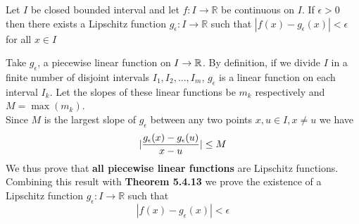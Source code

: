 \documentclass[boxes, qed]{homework}
\DeclarePairedDelimiter\abs{\lvert}{\rvert}%
\begin{document}
\begin{problem}Let $I$ be closed bounded interval and let $f: I \to \mathbb{R}$ be continuous on $I$.
  If $\epsilon > 0$ then there exists a Lipschitz function $g_{\epsilon}: I\to \mathbb{R}$ 
  such that $|f(x) - g_{\epsilon}(x)| < \epsilon$ for all $x\in I$
\end{problem}
\begin{solution}
  Take $g_{\epsilon}$, a piecewise linear function on $I\to \Bbb R$. By definition,
  if we divide $I$ in a finite number of disjoint intervals $I_1,I_2,\dots,I_m$,
  $g_{\epsilon}$ is a linear function on each interval $I_k$. 
  Let the slopes of these linear functions be $m_k$ respectively
  and $M=\max(m_k)$.\\
  Since $M$ is the largest slope of $g_{\epsilon}$
  between any two points $x,u\in{I}, x\ne{u}$ we have
  $$\abs{\frac{g_{\epsilon}(x)-g_{\epsilon}(u)}{x-u}} \le M$$
  We thus prove that \textbf{all piecewise linear functions} are Lipschitz functions.
  Combining this result with \textbf{Theorem 5.4.13} we prove
  the existence of a Lipschitz function $g_{\epsilon}: I\to \mathbb{R}$ 
  such that 
  $$|f(x) - g_{\epsilon}(x)| < \epsilon$$
\end{solution}
\end{document}
